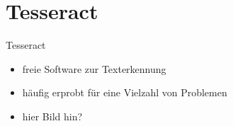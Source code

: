 \section{Tesseract}

\begin{frame}{Tesseract}
    \begin{itemize}
    	\item freie Software zur Texterkennung 
    	\item häufig erprobt für eine Vielzahl von Problemen 
    \end{itemize}
    \vspace{0.2cm}
    \begin{itemize}
    	\item hier Bild hin?
    \end{itemize}
\end{frame}
